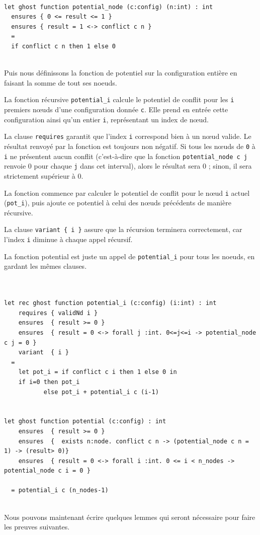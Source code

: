 \documentclass[11pt]{article}
\begin{document}
\lstset{language=why3,label= ,caption= ,captionpos=b,numbers=none}
\begin{lstlisting}

let ghost function potential_node (c:config) (n:int) : int
  ensures { 0 <= result <= 1 }
  ensures { result = 1 <-> conflict c n }
  =
  if conflict c n then 1 else 0


\end{lstlisting}
Puis nous définissons la fonction de potentiel sur la configuration entière en faisant la somme
de tout ses noeuds. 

La fonction récursive \texttt{potential\_i} calcule le potentiel de conflit pour les \texttt{i} premiers nœuds d'une configuration donnée \texttt{c}. 
Elle prend en entrée cette configuration ainsi qu'un entier \texttt{i}, représentant un index de nœud. 

La clause \texttt{requires} garantit que l'index \texttt{i} correspond bien à un nœud valide. 
Le résultat renvoyé par la fonction est toujours non négatif. 
Si tous les nœuds de \texttt{0} à \texttt{i} ne présentent aucun conflit (c'est-à-dire que la fonction \texttt{potential\_node c j} renvoie 0 pour chaque \texttt{j} dans cet interval), 
alors le résultat sera 0 ; sinon, il sera strictement supérieur à 0. 

La fonction commence par calculer le potentiel de conflit pour le nœud \texttt{i} actuel (\texttt{pot\_i}), 
puis ajoute ce potentiel à celui des nœuds précédents de manière récursive. 

La clause \texttt{variant \{ i \}} assure que la récursion terminera correctement, 
car l'index \texttt{i} diminue à chaque appel récursif.

La fonction potential est juste un appel de \texttt{potential\_i} pour tous les noeuds, en gardant les mêmes clauses.

\lstset{language=why3,label= ,caption= ,captionpos=b,numbers=none}
\begin{lstlisting}


let rec ghost function potential_i (c:config) (i:int) : int
    requires { validNd i }
    ensures  { result >= 0 }
    ensures  { result = 0 <-> forall j :int. 0<=j<=i -> potential_node c j = 0 }
    variant  { i }
  =
	let pot_i = if conflict c i then 1 else 0 in
	if i=0 then pot_i
	       else pot_i + potential_i c (i-1)


let ghost function potential (c:config) : int
    ensures  { result >= 0 }
    ensures  {  exists n:node. conflict c n -> (potential_node c n = 1) -> (result> 0)}
    ensures  { result = 0 <-> forall i :int. 0 <= i < n_nodes -> potential_node c i = 0 }

  = potential_i c (n_nodes-1)


\end{lstlisting}
Nous pouvons maintenant écrire quelques lemmes qui seront nécessaire pour faire les preuves suivantes. 
\end{document}
